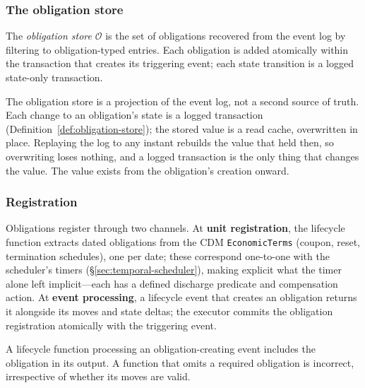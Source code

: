 \subsubsection{The obligation store}
\label{sec:obligation-store}

\begin{definition}
\label{def:obligation-store}
The \emph{obligation store} $\mathcal{O}$ is the set of obligations recovered from the event log by filtering to obligation-typed entries. Each obligation is added atomically within the transaction that creates its triggering event; each state transition is a logged state-only transaction.
\end{definition}

\noindent The obligation store is a projection of the event log, not a second source of truth. Each change to an obligation's state is a logged transaction (Definition~\ref{def:obligation-store}); the stored value is a read cache, overwritten in place. Replaying the log to any instant rebuilds the value that held then, so overwriting loses nothing, and a logged transaction is the only thing that changes the value. The value exists from the obligation's creation onward.

\subsubsection{Registration}
\label{sec:obligation-registration}

Obligations register through two channels. At \textbf{unit registration}, the lifecycle function extracts dated obligations from the CDM \texttt{EconomicTerms} (coupon, reset, termination schedules), one per date; these correspond one-to-one with the scheduler's timers (\S\ref{sec:temporal-scheduler}), making explicit what the timer alone left implicit---each has a defined discharge predicate and compensation action. At \textbf{event processing}, a lifecycle event that creates an obligation returns it alongside its moves and state deltas; the executor commits the obligation registration atomically with the triggering event.

\begin{principle}
\label{princ:obligation-completeness}
A lifecycle function processing an obligation-creating event includes the obligation in its output. A function that omits a required obligation is incorrect, irrespective of whether its moves are valid.
\end{principle}

